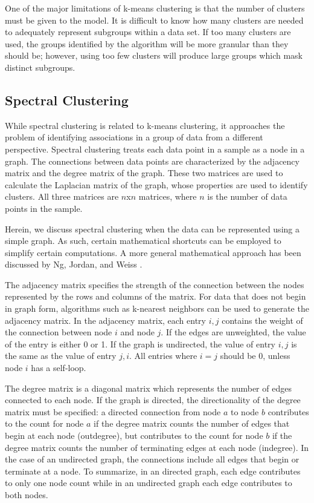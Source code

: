 One of the major limitations of k-means clustering is that the number of clusters must be given to the model. It is difficult to know how many clusters are needed to adequately represent subgroups within a data set. If too many clusters are used, the groups identified by the algorithm will be more granular than they should be; however, using too few clusters will produce large groups which mask distinct subgroups. 


\subsection{Spectral Clustering}

While spectral clustering is related to k-means clustering, it approaches the problem of identifying associations in a group of data from a different perspective. Spectral clustering treats each data point in a sample as a node in a graph. The connections between data points are characterized by the adjacency matrix and the degree matrix of the graph. These two matrices are used to calculate the Laplacian matrix of the graph, whose properties are used to identify clusters. All three matrices are $n$x$n$ matrices, where $n$ is the number of data points in the sample. 

Herein, we discuss spectral clustering when the data can be represented using a simple graph. As such, certain mathematical shortcuts can be employed to simplify certain computations. A more general mathematical approach has been discussed by Ng, Jordan, and Weiss \cite{Ng2002}.

The adjacency matrix specifies the strength of the connection between the nodes represented by the rows and columns of the matrix. For data that does not begin in graph form, algorithms such as k-nearest neighbors can be used to generate the adjacency matrix. In the adjacency matrix, each entry $i, j$ contains the weight of the connection between node $i$ and node $j$. If the edges are unweighted, the value of the entry is either 0 or 1. If the graph is undirected, the value of entry $i, j$ is the same as the value of entry $j, i$. All entries where $i=j$ should be 0, unless node $i$ has a self-loop.

The degree matrix is a diagonal matrix which represents the number of edges connected to each node. If the graph is directed, the directionality of the degree matrix must be specified: a directed connection from node $a$ to node $b$ contributes to the count for node $a$ if the degree matrix counts the number of edges that begin at each node (outdegree), but contributes to the count for node $b$ if the degree matrix counts the number of terminating edges at each node (indegree). In the case of an undirected graph, the connections include all edges that begin or terminate at a node. To summarize, in an directed graph, each edge contributes to only one node count while in an undirected graph each edge contributes to both nodes.

